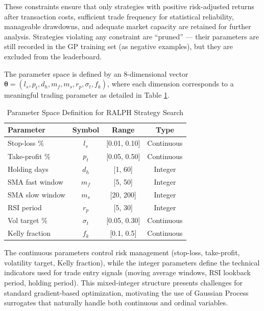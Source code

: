 \documentclass[conference]{IEEEtran}
\begin{document}
These constraints ensure that only strategies with positive risk-adjusted returns after transaction costs, sufficient trade frequency for statistical reliability, manageable drawdowns, and adequate market capacity are retained for further analysis. Strategies violating any constraint are ``pruned'' --- their parameters are still recorded in the GP training set (as negative examples), but they are excluded from the leaderboard.

The parameter space is defined by an 8-dimensional vector $\boldsymbol{\theta} = (l_s, p_t, d_h, m_f, m_s, r_p, \sigma_t, f_k)$, where each dimension corresponds to a meaningful trading parameter as detailed in Table \ref{tab:params}.

\begin{table}[h!]
\centering
\caption{Parameter Space Definition for RALPH Strategy Search}
\label{tab:params}
\begin{tabular}{@{}lccc@{}}
\toprule
\textbf{Parameter} & \textbf{Symbol} & \textbf{Range} & \textbf{Type} \\
\midrule
Stop-loss \%          & $l_s$      & [0.01, 0.10]  & Continuous \\
Take-profit \%        & $p_t$      & [0.05, 0.50]  & Continuous \\
Holding days          & $d_h$      & [1, 60]       & Integer \\
SMA fast window       & $m_f$      & [5, 50]       & Integer \\
SMA slow window       & $m_s$      & [20, 200]     & Integer \\
RSI period            & $r_p$      & [5, 30]       & Integer \\
Vol target \%         & $\sigma_t$ & [0.05, 0.30]  & Continuous \\
Kelly fraction        & $f_k$      & [0.1, 0.5]    & Continuous \\
\bottomrule
\end{tabular}
\end{table}

The continuous parameters control risk management (stop-loss, take-profit, volatility target, Kelly fraction), while the integer parameters define the technical indicators used for trade entry signals (moving average windows, RSI lookback period, holding period). This mixed-integer structure presents challenges for standard gradient-based optimization, motivating the use of Gaussian Process surrogates that naturally handle both continuous and ordinal variables.
\end{document}
